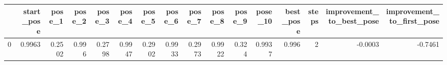 \begin{tabular}{lrrrrrrrrrrrrrrr}
\toprule
{} &  start\_pose &  pose\_1 &  pose\_2 &  pose\_3 &  pose\_4 &  pose\_5 &  pose\_6 &  pose\_7 &  pose\_8 &  pose\_9 &  pose\_10 &  best\_pose &  steps &  improvement\_to\_best\_pose &  improvement\_to\_first\_pose \\
\midrule
0 &      0.9963 &  0.2502 &   0.996 &  0.2798 &  0.9947 &  0.2902 &  0.9933 &  0.2973 &  0.9922 &   0.324 &   0.9937 &      0.996 &      2 &                   -0.0003 &                    -0.7461 \\
\bottomrule
\end{tabular}
